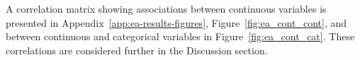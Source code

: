 A correlation matrix showing associations between continuous variables is presented in Appendix~\ref{app:ea-results-figures}, Figure~\ref{fig:ea_cont_cont}, and between continuous and categorical variables in Figure~\ref{fig:ea_cont_cat}. These correlations are considered further in the Discussion section.


